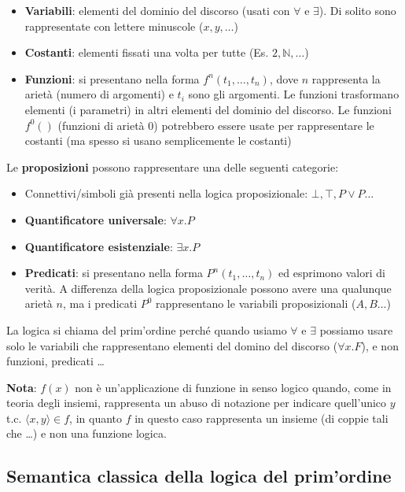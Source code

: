 \documentclass[
  a4paper,
]{article}
\providecommand{\tightlist}{%
  \setlength{\itemsep}{0pt}\setlength{\parskip}{0pt}}
\begin{document}
\begin{itemize}
\tightlist
\item
  \textbf{Variabili}: elementi del dominio del discorso (usati con
  \(\forall\) e \(\exists\)). Di solito sono rappresentate con lettere
  minuscole (\(x, y, \dots\))
\item
  \textbf{Costanti}: elementi fissati una volta per tutte (Es.
  \(2, \mathbb{N}, \dots\))
\item
  \textbf{Funzioni}: si presentano nella forma \(f^n(t_1, \dots, t_n)\),
  dove \(n\) rappresenta la arietà (numero di argomenti) e \(t_i\) sono
  gli argomenti. Le funzioni trasformano elementi (i parametri) in altri
  elementi del dominio del discorso. Le funzioni \(f^0()\) (funzioni di
  arietà 0) potrebbero essere usate per rappresentare le costanti (ma
  spesso si usano semplicemente le costanti)
\end{itemize}

Le \textbf{proposizioni} possono rappresentare una delle seguenti
categorie:

\begin{itemize}
\tightlist
\item
  Connettivi/simboli già presenti nella logica proposizionale:
  \(\bot , \top , P \lor P \dots\)
\item
  \textbf{Quantificatore universale}: \(\forall x.P\)
\item
  \textbf{Quantificatore esistenziale}: \(\exists x.P\)
\item
  \textbf{Predicati}: si presentano nella forma \(P^n(t_1, \dots, t_n)\)
  ed esprimono valori di verità. A differenza della logica
  proposizionale possono avere una qualunque arietà \(n\), ma i
  predicati \(P^0\) rappresentano le variabili proposizionali
  (\(A, B \dots\))
\end{itemize}

La logica si chiama del prim'ordine perché quando usiamo \(\forall\) e
\(\exists\) possiamo usare solo le variabili che rappresentano elementi
del domino del discorso (\(\forall x. F\)), e non funzioni, predicati
\ldots{}

\textbf{Nota}: \(f(x)\) non è un'applicazione di funzione in senso
logico quando, come in teoria degli insiemi, rappresenta un abuso di
notazione per indicare quell'unico \(y\) t.c.
\(\langle x, y \rangle \in f\), in quanto \(f\) in questo caso
rappresenta un insieme (di coppie tali che \ldots) e non una funzione
logica.

\hypertarget{semantica-classica-della-logica-del-primordine}{%
\subsection{Semantica classica della logica del
prim'ordine}\label{semantica-classica-della-logica-del-primordine}}
\end{document}
